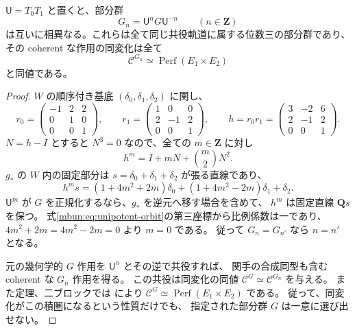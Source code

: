 \begin{corollary}[同じ共役軌道内の無限個の中心部分群]
\label{mbun:cor:infinite-orbit}
$\mathsf U=T_0T_1$ と置くと、部分群
\[
 G_n=\mathsf U^nG\mathsf U^{-n}\qquad(n\in\mathbf Z)
\]
は互いに相異なる。これらは全て同じ共役軌道に属する位数三の部分群であり、
その coherent な作用の同変化は全て
\[
 \mathcal C^{G_n}\simeq\operatorname{Perf}(E_1\times E_2)
\]
と同値である。
\end{corollary}
\begin{proof}
$W$ の順序付き基底 $(\delta_0,\delta_1,\delta_2)$ に関し、
\[
 r_0=\begin{pmatrix}-1&2&2\\0&1&0\\0&0&1\end{pmatrix},
 \qquad
 r_1=\begin{pmatrix}1&0&0\\2&-1&2\\0&0&1\end{pmatrix},
 \qquad
 h=r_0r_1=\begin{pmatrix}3&-2&6\\2&-1&2\\0&0&1\end{pmatrix}.
\]
$N=h-I$ とすると $N^3=0$ なので、全ての $m\in\mathbf Z$ に対し
\[
 h^m=I+mN+\binom m2N^2 .
\]
$g_*$ の $W$ 内の固定部分は
$s=\delta_0+\delta_1+\delta_2$ が張る直線であり、
\begin{equation}\label{mbun:eq:unipotent-orbit}
 h^ms=
 (1+4m^2+2m)\delta_0+
 (1+4m^2-2m)\delta_1+\delta_2 .
\end{equation}
$\mathsf U^m$ が $G$ を正規化するなら、$g_*$ を逆元へ移す場合を含めて、
$h^m$ は固定直線 $\mathbf Qs$ を保つ。
式\eqref{mbun:eq:unipotent-orbit}の第三座標から比例係数は一であり、
$4m^2+2m=4m^2-2m=0$ より $m=0$ である。
従って $G_n=G_{n'}$ なら $n=n'$ となる。

元の幾何学的 $G$ 作用を $\mathsf U^n$ とその逆で共役すれば、
関手の合成同型も含む coherent な $G_n$ 作用を得る。
この共役は同変化の同値
$\mathcal C^G\simeq\mathcal C^{G_n}$ を与える。
また定理、二ブロックでは
\cite[Theorems~0.1 and~5.8]{TBHu}により
$\mathcal C^G\simeq\operatorname{Perf}(E_1\times E_2)$ である。
従って、同変化がこの積圏になるという性質だけでも、
指定された部分群 $G$ は一意に選び出せない。
\end{proof}

